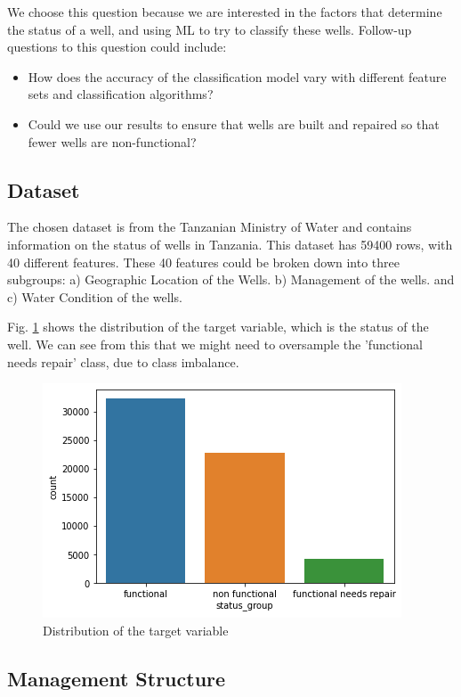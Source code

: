 \documentclass[conference]{IEEEtran}
\begin{document}
We choose this question because we are interested in the factors that determine the status of a well, and using ML to try to classify these wells. Follow-up questions to this question could include:
    \begin{itemize}
        \item How does the accuracy of the classification model vary with different feature sets and classification algorithms?
        \item Could we use our results to ensure that wells are built and repaired so that fewer wells are non-functional?
    \end{itemize}

\subsection{Dataset}

The chosen dataset is from the Tanzanian Ministry of Water and contains information on the status of wells in Tanzania. This dataset has 59400 rows, with 40 different features. These 40 features could be broken down into three subgroups: a) Geographic Location of the Wells. b) Management of the wells. and c) Water Condition of the wells.

Fig. \ref{fig:status_groups} shows the distribution of the target variable, which is the status of the well. We can see from this that we might need to oversample the 'functional needs repair' class, due to class imbalance.

\begin{figure}[h]
    \centering
    \includegraphics[scale=0.5]{figures/status_groups.png}
    \caption{Distribution of the target variable}
    \label{fig:status_groups}
\end{figure}

\subsection{Management Structure}
\end{document}
